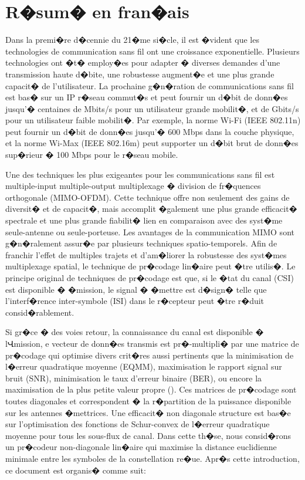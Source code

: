 
\chapter*{R�sum� en fran�ais} %
\label{Resume}

Dans la premi�re d�cennie du 21�me si�cle, il est �vident que les technologies de communication sans fil ont une croissance exponentielle. Plusieurs technologies ont �t� employ�es pour adapter � diverses demandes d'une transmission haute d�bite, une robustesse augment�e et une plus grande capacit� de l'utilisateur. La prochaine g�n�ration de communications sans fil est bas� sur un IP r�seau commut�s et peut fournir un d�bit de donn�es jusqu'� centaines de Mbits/s pour un utilisateur grande mobilit�, et de Gbits/s pour un utilisateur faible mobilit�. Par exemple, la norme Wi-Fi (IEEE 802.11n) peut fournir un d�bit de donn�es jusqu'� 600 Mbps dans la couche physique, et la norme Wi-Max (IEEE 802.16m) peut supporter un d�bit brut de donn�es sup�rieur � 100 Mbps pour le r�seau mobile.

Une des techniques les plus exigeantes pour les communications sans fil est multiple-input multiple-output multiplexage � division de fr�quences orthogonale (MIMO-OFDM). Cette technique offre non seulement des gains de diversit� et de capacit�, mais accomplit �galement une plus grande efficacit� spectrale et une plus grande fiabilit� lien en comparaison avec des syst�me seule-antenne ou seule-porteuse. Les avantages de la communication MIMO sont g�n�ralement assur�e par plusieurs techniques spatio-temporels. Afin de franchir l'effet de multiples trajets et d'am�liorer la robustesse des syst�mes multiplexage spatial, le technique de pr�codage lin�aire peut �tre utilis�. Le principe original de techniques de pr�codage est que, si le �tat du canal (CSI) est disponible � �mission, le signal � �mettre est d�sign� telle que l'interf�rence inter-symbole (ISI) dans le r�cepteur peut �tre r�duit consid�rablement.

Si gr�ce � des voies retour, la connaissance du canal est disponible � lՎmission, e vecteur de donn�es transmis est pr�-multipli� par une matrice de pr�codage qui optimise divers crit�res aussi pertinents que la minimisation de l�erreur quadratique moyenne (EQMM), maximisation le rapport signal sur bruit (SNR), minimisation le taux d'erreur binaire (BER), ou encore la maximisation de la plus petite valeur propre (\maxlmin). Ces matrices de pr�codage sont toutes diagonales et correspondent � la r�partition de la puissance disponible sur les antennes �mettrices. Une efficacit� non diagonale structure est bas�e sur l'optimisation des fonctions de Schur-convex de l�erreur quadratique moyenne pour tous les sous-flux de canal. Dans cette th�se, nous consid�rons un pr�codeur non-diagonale lin�aire qui maximise la distance euclidienne minimale entre les symboles de la constellation re�ue. Apr�s cette introduction, ce document est organis� comme suit:

